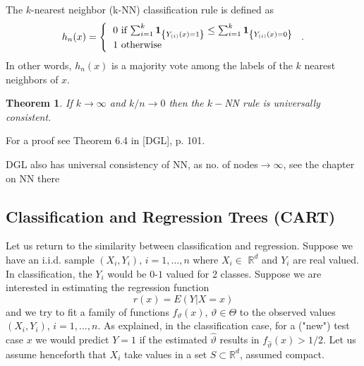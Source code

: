 \documentclass[11pt,twoside]{article}%
\theoremstyle{change}
\newtheorem{theorem}{Theorem}[section]
\newenvironment{quote-env}{\begin{quote}\sffamily }{\end{quote}}
\newenvironment{mycomments-env}[1][Mycomments]{\textbf{#1.} \begin{quote-env} }{ \end{quote-env}  \ \rule{0.5em}{0.5em}}
\begin{document}
The $k$-nearest neighbor (k-NN) classification rule is defined as
\[
h_{n}(x)=\left\{
\begin{tabular}
[c]{l}%
$0$ if $\sum_{i=1}^{k}\mathbf{1}_{\left\{  Y_{(i)}(x)=1\right\}  }\leq
\sum_{i=1}^{k}\mathbf{1}_{\left\{  Y_{(i)}(x)=0\right\}  }$\\
$1$ otherwise
\end{tabular}
\right.  .
\]
In other words, $h_{n}(x)$ is a majority vote among the labels of the $k$
nearest neighbors of $x$.

\begin{theorem}
If $k\rightarrow\infty$ and $k/n\rightarrow0$ then the $k-$NN rule is
universally consistent.
\end{theorem}

For a proof see Theorem 6.4 in [DGL], p. 101.%

\begin{mycomments}%


\begin{mycomments-env}
DGL also has universal consistency of NN, as no. of nodes$\rightarrow\infty$,
see the chapter on NN there
\end{mycomments-env}%

\end{mycomments}%


\subsection{Classification and Regression Trees (CART)}

Let us return to the similarity between classification and regression. Suppose
we have an i.i.d. sample $\left(  X_{i},Y_{i}\right)  $, $i=1,\ldots,n $ where
$X_{i}\in$ $\mathbb{R}^{d}$ and $Y_{i}$ are real valued. In classification,
the $Y_{i}$ would be $0$-$1$ valued for 2 classes. Suppose we are interested
in estimating the regression function
\begin{equation}
r(x)=E\left(  Y|X=x\right)
\end{equation}
and we try to fit a family of functions $f_{\vartheta}(x)$, $\vartheta
\in\Theta$ to the observed values $\left(  X_{i},Y_{i}\right)  $,
$i=1,\ldots,n$. As explained, in the classification case, for a ("new") test
case $x$ we would predict $Y=1$ if the estimated $\hat{\vartheta}$ results in
$f_{\hat{\vartheta}}(x)>1/2$. Let us assume henceforth that $X_{i}$ take
values in a set $S\subset\mathbb{R}^{d}$, assumed compact.
\end{document}
